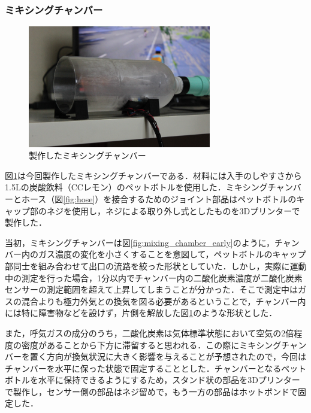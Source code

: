 \subsubsection{ミキシングチャンバー}

\begin{figure}[H]
  \begin{center}
    \includegraphics[width=8cm]{fig/mixing_chamber}
    \caption{製作したミキシングチャンバー}
    \label{fig:mixing_chamber}
  \end{center}
\end{figure}

図\ref{fig:mixing_chamber}は今回製作したミキシングチャンバーである．材料には入手のしやすさから1.5Lの炭酸飲料（CCレモン）のペットボトルを使用した．ミキシングチャンバーとホース（図\ref{fig:hose}）を接合するためのジョイント部品はペットボトルのキャップ部のネジを使用し，ネジによる取り外し式としたものを3Dプリンターで製作した．

当初，ミキシングチャンバーは図\ref{fig:mixing_chamber_early}のように，チャンバー内のガス濃度の変化を小さくすることを意図して，ペットボトルのキャップ部同士を組み合わせて出口の流路を絞った形状としていた．しかし，実際に運動中の測定を行った場合，1分以内でチャンバー内の二酸化炭素濃度が二酸化炭素センサーの測定範囲を超えて上昇してしまうことが分かった．そこで測定中はガスの混合よりも極力外気との換気を図る必要があるということで，チャンバー内には特に障害物などを設けず，片側を解放した図\ref{fig:mixing_chamber}のような形状とした．

また，呼気ガスの成分のうち，二酸化炭素は気体標準状態において空気の2倍程度の密度があることから下方に滞留すると思われる．この際にミキシングチャンバーを置く方向が換気状況に大きく影響を与えることが予想されたので，今回はチャンバーを水平に保った状態で固定することとした．チャンバーとなるペットボトルを水平に保持できるようにするため，スタンド状の部品を3Dプリンターで製作し，センサー側の部品はネジ留めで，もう一方の部品はホットボンドで固定した．

